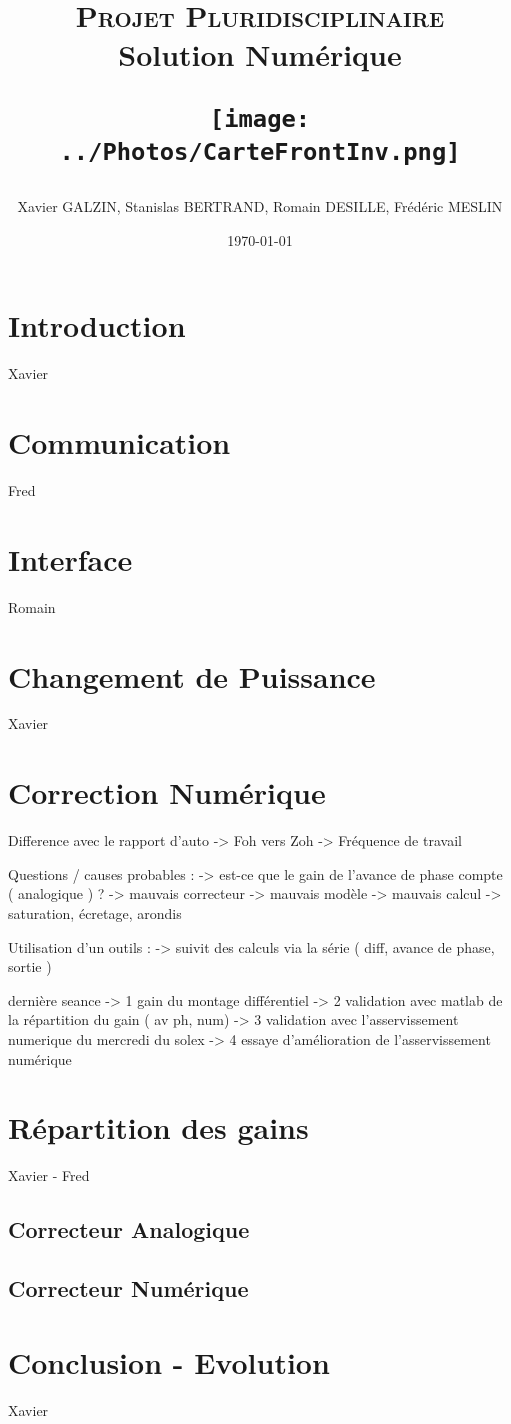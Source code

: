 \documentclass[11pt, french]{article} %
\title{\textsc{Projet Pluridisciplinaire} \\ Solution Numérique \\
\begin{minipage}[c][20cm][c]{15cm}
\texttt{[image: ../Photos/CarteFrontInv.png]}
\end{minipage}}
\author{Xavier GALZIN, Stanislas BERTRAND, Romain DESILLE, Frédéric MESLIN}
\date{\today}
\begin{document}
\maketitle

\pagebreak
\tableofcontents

\pagebreak
\section*{Introduction}
Xavier

\section{Communication}
Fred
\section{Interface}
Romain
\section{Changement de Puissance}
Xavier
\section{Correction Numérique}

Difference avec le rapport d'auto
-> Foh vers Zoh
-> Fréquence de travail

Questions / causes probables :
-> est-ce que le gain de l'avance de phase compte ( analogique ) ?
-> mauvais correcteur
-> mauvais modèle
-> mauvais calcul -> saturation, écretage, arondis

Utilisation d'un outils :
-> suivit des calculs via la série ( diff, avance de phase, sortie )

dernière seance
-> 1 gain du montage différentiel
-> 2 validation avec matlab de la répartition du gain ( av ph, num)
-> 3 validation avec l'asservissement numerique du mercredi du solex
-> 4 essaye d'amélioration de l'asservissement numérique


\section{Répartition des gains}
Xavier - Fred
\subsection{Correcteur Analogique}
\subsection{Correcteur Numérique}
\section*{Conclusion - Evolution}
Xavier
\end{document}
